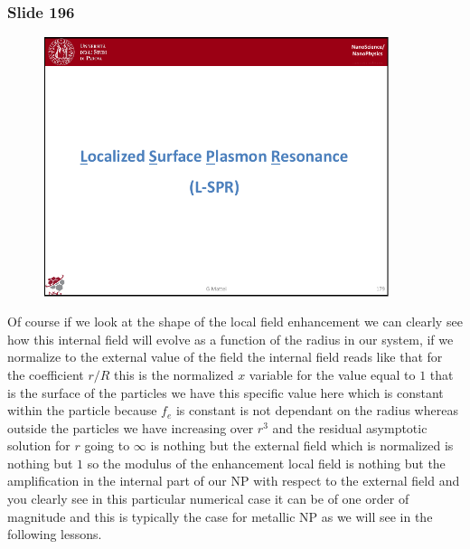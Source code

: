 \documentclass[../main/main.tex]{subfiles}
\begin{document}
\newpage
\subsubsection{Slide 196}

\begin{figure}[h!]
\centering
\includegraphics[page=18,width=0.9\textwidth]{../lessons/pdf_file/11_lesson.pdf}
\end{figure}

Of course if we look at the shape of the local field enhancement we can clearly see how this internal field will evolve as a  function of the radius in our system, if we normalize to the external value of the field the internal field reads like that for the coefficient $r/R$ this is the normalized $x$ variable for the value equal to $1$ that is the surface of the particles we have this specific value here which is constant within the particle because $f_e$ is constant is not dependant on the radius whereas outside the particles we have increasing over $r^3$ and the residual asymptotic solution for $r$ going to $\infty$ is nothing but the external field which is normalized is nothing but $1$ so the modulus of the enhancement local field is nothing but the amplification in the internal part of our NP with respect to the external field and you clearly see in this particular numerical case it can be of one order of magnitude and this is typically the case for metallic NP as we will see in the following lessons.


\clearpage
\end{document}
